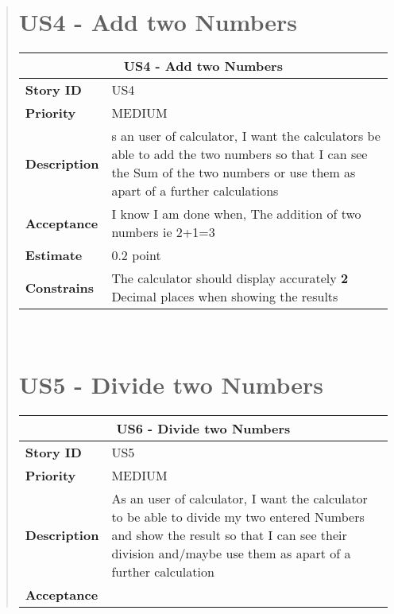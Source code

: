 \documentclass[12pt]{report}
\begin{document}
\begin{quote}
         \section{US4 - Add two Numbers }
                \begin{tabular}{ |p{4cm}|p{10cm}| }
                 \hline
                 \multicolumn{2}{|c|}{\textbf{US4 - Add two Numbers } } \\
                 \hline
                 \textbf {Story ID}& US4  \\
                 \hline
                 \textbf{Priority} & MEDIUM \\
                 \hline
                 \textbf{Description}   &  s an user of calculator, I want the calculators be able to add the two numbers so that I can see the Sum of the two numbers or use them as apart of a further calculations\\
                 \hline
                 \textbf{Acceptance}& 
                
                 I know I am done when, The addition of two numbers ie 2+1=3
                
                \\
                 \hline
                 \textbf{Estimate} &  0.2  point  \\
                 \hline
                 \textbf{Constrains}& The calculator should display accurately \textbf{2} Decimal places when showing the results \\
                 \hline
                \end{tabular}
            \hfill\break\\
            
            
            \section{US5 - Divide two Numbers }
                \begin{tabular}{ |p{4cm}|p{10cm}| }
                 \hline
                 \multicolumn{2}{|c|}{\textbf{US6 - Divide two Numbers} } \\
                 \hline
                 \textbf {Story ID}& US5  \\
                 \hline
                 \textbf{Priority} & MEDIUM \\
                 \hline
                 \textbf{Description}   & As an user of calculator, I want the  calculator to be able to divide my two entered Numbers and show the result so that I can see their division and/maybe use them as apart of a further calculation \\
                 \hline
                 \textbf{Acceptance}& 
                

\end{tabular}
\end{quote}
\end{document}
